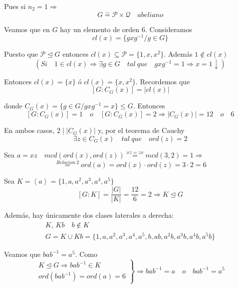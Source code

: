\documentclass{article}
\begin{document}
Pues si $n_2=1\Rightarrow$
\begin{equation*}
G\overset{\sim}{=} \mathcal{P}\times \mathcal{Q} \quad abeliano
\end{equation*}

Veamos que en $G$ hay un elemento de orden 6. Consideramos
\begin{equation*}
cl(x)=\{gxg^{-1}/g\in G\}
\end{equation*}

Puesto que $\mathcal{P}\unlhd G$ entonces $cl(x)\subseteq \mathcal{P}=\{1,x,x^2\}$. Además $1\notin cl(x)$
\begin{equation*}
(Si\quad 1\in cl(x)\Rightarrow \exists g\in G\quad tal\:que\quad gxg^{-1}=1\Rightarrow x=1\downarrow)
\end{equation*}

Entonces $cl(x)=\{x\}$ ó $cl(x)=\{x,x^2\}$. Recordemos que
\begin{equation*}
\left[G:C_G(x)\right]=|cl(x)|
\end{equation*}

donde $C_G(x)=\{g\in G/gxg^{-1}=x\}\leq G$. Entonces
\begin{equation*}
\left[G:C_G(x)\right]=1\quad o\quad \left[G:C_G(x)\right]=2\Rightarrow |C_G(x)|=12\quad o\quad 6
\end{equation*}

En ambos casos, $2\mid |C_G(x)|$ y, por el teorema de Cauchy
\begin{equation*}
\exists z\in C_G(x)\quad tal\:que\quad ord(z)=2
\end{equation*}

Sea $a=xz\quad mcd(ord(x),ord(z))\overset{xz=zx}{=}mcd(3,2)=1\Rightarrow$
\begin{equation*}
\overset{Relacion\:2}{=} ord(a)=ord(x)\cdot ord(z)=3\cdot 2=6
\end{equation*}

Sea $K=\left\langle a\right\rangle=\{1,a,a^2,a^3,a^4,a^5\}$
\begin{equation*}
\left[G:K\right]=\frac{|G|}{|K|}=\frac{12}{6}=2\Rightarrow K\unlhd G
\end{equation*}

Además, hay únicamente dos clases laterales a derecha:
\begin{gather*}
K,\,Kb\quad b\notin K \\
G=K\cup Kb=\{1,a,a^2,a^3,a^4,a^5,b,ab,a^2b,a^3b,a^4b,a^5b\}
\end{gather*}

Veamos que $bab^{-1}=a^5$. Como
\begin{equation*}
\left.\begin{array}{c}
K\unlhd G\Rightarrow bab^{-1}\in K\\
ord(bab^{-1})=ord(a)=6
\end{array}\right\rbrace \Rightarrow bab^{-1}=a\quad o\quad bab^{-1}=a^5
\end{equation*}
\end{document}
